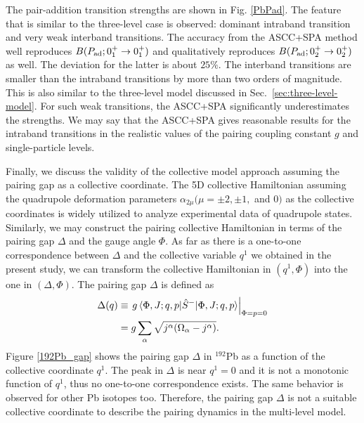 \documentclass[%
superscriptaddress,
showpacs,
nofootinbib,
amsmath,amssymb,
aps,
prc,
twocolumn,
floatfix ]%
{revtex4-1}
\begin{document}
The pair-addition transition strengths are shown in Fig. \ref{PbPad}.
The feature that is similar to the three-level case is observed:
dominant intraband transition and very weak interband transitions.
The accuracy from the ASCC+SPA method well reproduces
$B(P_{\rm ad};0_1^+\rightarrow 0_1^+)$
and qualitatively reproduces
$B(P_{\rm ad};0_2^+\rightarrow 0_2^+)$ as well.
The deviation for the latter is about $25\%$.
The interband transitions are smaller than the intraband transitions
by more than two orders of magnitude.
This is also similar to the three-level model discussed
in Sec.~\ref{sec:three-level-model}.
For such weak transitions, the ASCC+SPA significantly
underestimates the strengths.
We may say that the ASCC+SPA gives reasonable results for the intraband
transitions in the realistic values of the pairing coupling constant $g$ and
single-particle levels.

Finally, we discuss the validity of the collective model approach
assuming the pairing gap as a collective coordinate.
The 5D collective Hamiltonian assuming the quadrupole deformation
parameters $\alpha_{2\mu} (\mu=\pm2,\pm1,$ and $0)$ as the collective coordinates
is widely utilized to analyze experimental data of quadrupole states.
Similarly, we may construct the pairing collective Hamiltonian
in terms of the pairing gap $\Delta$ and the gauge angle $\Phi$. 
As far as there is a one-to-one correspondence between $\Delta$ 
and the collective variable $q^1$ we obtained in the present study,
we can transform the collective Hamiltonian in $(q^1,\Phi)$
into the one in $(\Delta,\Phi)$.
The pairing gap $\Delta$ is defined as
\begin{align}
  \Delta (q) &\equiv \left. g\braket{\Phi,J;q,p|\hat{S}^-|\Phi,J;q,p} \right|_{\Phi=p=0} \nonumber \\
  &= g\sum_\alpha \sqrt{j^\alpha(\Omega_\alpha-j^\alpha)} .
\end{align}
Figure \ref{192Pb_gap} shows the pairing gap $\Delta$ in ${}^{192}$Pb
as a function of the collective coordinate $q^1$.
The peak in $\Delta$ is near $q^1=0$ and it is not a monotonic
function of $q^1$, thus no one-to-one correspondence exists.
The same behavior is observed for other Pb isotopes too.
Therefore, the pairing gap $\Delta$ is not a suitable collective coordinate
to describe the pairing dynamics in the multi-level model.

\end{document}
